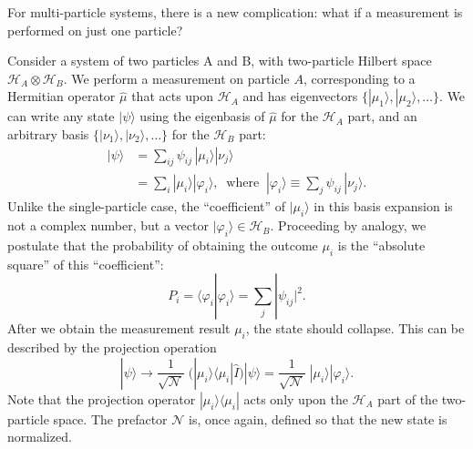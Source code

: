 \documentclass[pra,12pt]{revtex4}
\begin{document}
For multi-particle systems, there is a new complication: what if a
measurement is performed on just one particle?

Consider a system of two particles A and B, with two-particle Hilbert
space $\mathscr{H}_A \otimes \mathscr{H}_B$.  We perform a measurement
on particle $A$, corresponding to a Hermitian operator $\hat{\mu}$
that acts upon $\mathscr{H}_A$ and has eigenvectors $\{|\mu_1\rangle,
|\mu_2\rangle,\dots\}$.  We can write any state $|\psi\rangle$ using
the eigenbasis of $\hat{\mu}$ for the $\mathscr{H}_A$ part, and an
arbitrary basis $\{|\nu_1\rangle, |\nu_2\rangle,\dots\}$ for the
$\mathscr{H}_B$ part:
$$\begin{aligned}|\psi\rangle &= \sum_{ij} \psi_{ij}\, |\mu_i\rangle |\nu_j\rangle \\&= \sum_i |\mu_i\rangle |\varphi_i\rangle, \;\;\mathrm{where}\;\;|\varphi_i\rangle\equiv \sum_j \psi_{ij}\,|\nu_j\rangle.\end{aligned}$$
Unlike the single-particle case, the ``coefficient'' of
$|\mu_i\rangle$ in this basis expansion is not a complex number, but a
vector $|\varphi_i\rangle \in \mathscr{H}_B$.  Proceeding by analogy,
we postulate that the probability of obtaining the outcome $\mu_i$ is
the ``absolute square'' of this ``coefficient'':
$$P_i = \langle \varphi_i|\varphi_i\rangle = \sum_j |\psi_{ij}|^2.$$
After we obtain the measurement result $\mu_i$, the state should
collapse.  This can be described by the projection operation
$$|\psi\rangle \longrightarrow \frac{1}{\sqrt{\mathcal{N}}}\; \Big(|\mu_i\rangle\langle \mu_i|  \hat{I}\Big) |\psi\rangle = \frac{1}{\sqrt{\mathcal{N}}}\; |\mu_i\rangle |\varphi_i\rangle.$$
Note that the projection operator $|\mu_i\rangle\langle \mu_i|$ acts
only upon the $\mathscr{H}_A$ part of the two-particle space.  The
prefactor $\mathcal{N}$ is, once again, defined so that the new state
is normalized.
\end{document}
